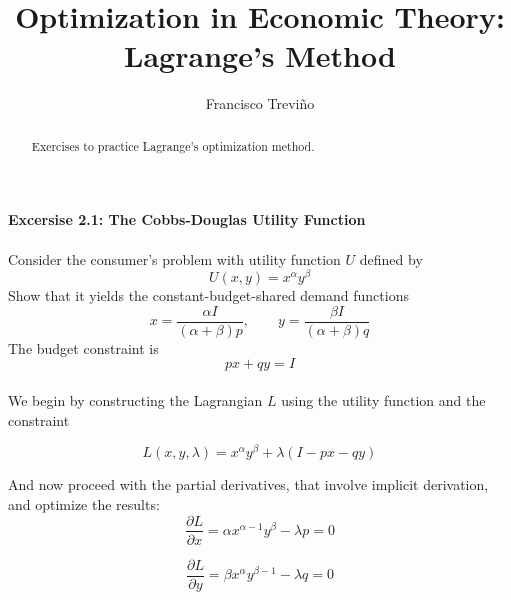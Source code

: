 \documentclass{article}
\author{Francisco Treviño}
\title{Optimization in Economic Theory:\\Lagrange's Method}
\begin{document}
\maketitle

\begin{abstract}
Exercises to practice Lagrange's optimization method.
\end{abstract}

\paragraph{Excersise 2.1: The Cobbs-Douglas Utility Function}
\paragraph{}
Consider the consumer's problem with utility function $U$ defined by
  \begin{equation}
    U(x, y) = x^\alpha y^\beta
  \end{equation}
Show that it yields the constant-budget-shared demand functions
  \begin{equation}\label{df}
    x = \frac{\alpha I}{(\alpha + \beta)p}, \qquad y = \frac{\beta I}{(\alpha + \beta)q}
  \end{equation}
The budget constraint is
  \begin{equation}
    px + qy = I
  \end{equation}

\paragraph{}
We begin by constructing the Lagrangian $L$ using the utility function and the constraint

  \begin{equation}
     L(x, y, \lambda) = x^\alpha y^\beta + \lambda (I - px - qy)
  \end{equation}

And now proceed with the partial derivatives, that involve implicit derivation, and optimize the results:
  \begin{equation}
    \frac{\partial L}{\partial x} = \alpha x^{\alpha - 1} y^\beta - \lambda p = 0
  \end{equation}

  \begin{equation}
    \frac{\partial L}{\partial y} = \beta x^\alpha y^{\beta - 1} - \lambda q = 0
  \end{equation}
\end{document}
